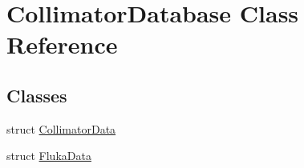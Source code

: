 \hypertarget{classCollimatorDatabase}{}\section{Collimator\+Database Class Reference}
\label{classCollimatorDatabase}
\subsection*{Classes}
\begin{DoxyCompactItemize}
\item 
struct \hyperlink{structCollimatorDatabase_1_1CollimatorData}{Collimator\+Data}
\item 
struct \hyperlink{structCollimatorDatabase_1_1FlukaData}{Fluka\+Data}
\end{DoxyCompactItemize}
